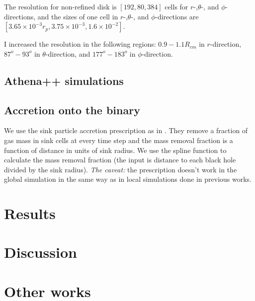 \documentclass[twocolumn]{aastex631}
\begin{document}
The resolution for non-refined disk is $[192,80,384]$ cells for $r$-,$\theta$-, and $\phi$-directions, and the sizes of one cell in $r$-,$\theta$-, and $\phi$-directions are $[3.65\times 10^{-3}r_p, 3.75\times 10^{-3}, 1.6\times 10^{-2}]$. 

I increased the resolution in the following regions: $0.9-1.1 R_{cm}$ in $r$-direction, $87^o-93^o$ in $\theta$-direction, and $177^o-183^o$ in $\phi$-direction. 


\subsection{Athena++ simulations}

\subsection{Accretion onto the binary}
We use the sink particle accretion prescription as in \citet{Munoz2019}. They remove a fraction of gas mass in sink cells at every time step and the mass removal fraction is a function of distance in units of sink radius. We use the spline function to calculate the mass removal fraction (the input is distance to each black hole divided by the sink radius).
\textit{The caveat:} the prescription doesn't work in the global simulation in the same way as in local simulations done in previous works. 

\section{Results}
\label{sec:results}

\section{Discussion} 
\label{sec:conclusion}

\section{Other works}



\end{document}
